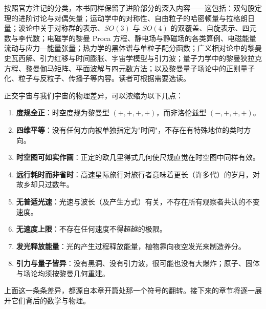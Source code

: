 
按照官方注记的分类，本书同样保留了进阶部分的深入内容——这包括：双勾股定理的进阶讨论与对偶矢量；运动学中的对称性、自由粒子的哈密顿量与拉格朗日量；波论中关于对称群的表示、$SO(3)$ 与 $SO(4)$ 的双覆盖、自旋表示、四元数与李代数；电磁学的黎曼 Proca 方程、静电场与静磁场的各类算例、电磁能量流动与应力—能量张量；热力学的黑体谱与单粒子配分函数；广义相对论中的黎曼史瓦西解、引力红移与时间膨胀、宇宙学模型与引力波；量子力学中的黎曼狄拉克方程、黎曼伽马矩阵、平面波解与四元数方法；以及黎曼量子场论中的正则量子化、粒子与反粒子、传播子等内容。读者可根据需要选读。






\begin{keybox}[核心设定速记]
正交宇宙与我们宇宙的物理差异，可以浓缩为以下几点：

\begin{enumerate}
  \item \textbf{度规全正}：时空度规为黎曼型 $(+,+,+,+)$，而非洛伦兹型 $(-,+,+,+)$。
  \item \textbf{四维平等}：没有任何方向被单独指定为"时间"，不存在有特殊地位的类时方向。
  \item \textbf{时空图可如实作画}：正定的欧几里得式几何使尺规直觉在时空图中同样有效。
  \item \textbf{远行耗时而非省时}：高速星际旅行对旅行者意味着更长（许多代）的岁月，对故乡却只过数年。
  \item \textbf{无普适光速}：光速与波长（及产生方式）有关，不存在所有观察者共认的不变速度。
  \item \textbf{无速度上限}：不存在任何速度不得超越的极限。
  \item \textbf{发光释放能量}：光的产生过程释放能量，植物靠向夜空发光来制造养分。
  \item \textbf{引力与量子皆异}：没有黑洞、没有引力波，很可能也没有大爆炸；原子、固体与场论均须按黎曼几何重建。
\end{enumerate}
\end{keybox}

上面这一条条差异，都源自本章开篇处那一个符号的翻转。接下来的章节将逐一展开它们背后的数学与物理。
